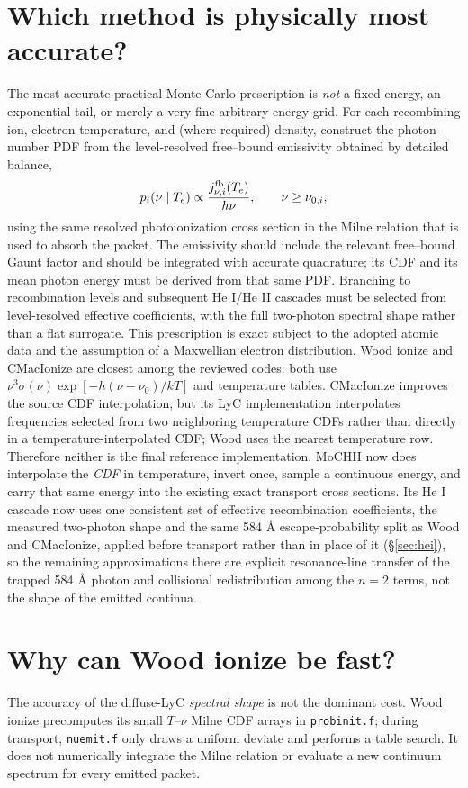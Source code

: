 \documentclass[11pt]{my_memo}
\begin{document}
\section{Which method is physically most accurate?}\label{sec:accurate}
The most accurate practical Monte-Carlo prescription is \emph{not} a fixed energy, an exponential tail, or merely a very fine arbitrary energy grid.  For each recombining ion, electron temperature, and (where required) density, construct the photon-number PDF from the level-resolved free--bound emissivity obtained by detailed balance,
\[p_i(\nu\mid T_e)\propto \frac{j^{\rm fb}_{\nu,i}(T_e)}{h\nu},\qquad \nu\ge\nu_{0,i},\]
using the same resolved photoionization cross section in the Milne relation that is used to absorb the packet.  The emissivity should include the relevant free--bound Gaunt factor and should be integrated with accurate quadrature; its CDF and its mean photon energy must be derived from that same PDF.  Branching to recombination levels and subsequent He I/He II cascades must be selected from level-resolved effective coefficients, with the full two-photon spectral shape rather than a flat surrogate.  This prescription is exact subject to the adopted atomic data and the assumption of a Maxwellian electron distribution.
Wood ionize and CMacIonize are closest among the reviewed codes: both use $\nu^3\sigma(\nu)\exp[-h(\nu-\nu_0)/kT]$ and temperature tables.  CMacIonize improves the source CDF interpolation, but its LyC implementation interpolates frequencies selected from two neighboring temperature CDFs rather than directly in a temperature-interpolated CDF; Wood uses the nearest temperature row.  Therefore neither is the final reference implementation.  MoCHII now does interpolate the \emph{CDF} in temperature, invert once, sample a continuous energy, and carry that same energy into the existing exact transport cross sections.  Its He I cascade now uses one consistent set of effective recombination coefficients, the measured two-photon shape and the same 584 \AA{} escape-probability split as Wood and CMacIonize, applied before transport rather than in place of it (\S\ref{sec:hei}), so the remaining approximations there are explicit resonance-line transfer of the trapped 584 \AA{} photon and collisional redistribution among the $n=2$ terms, not the shape of the emitted continua.
\section{Why can Wood ionize be fast?}
The accuracy of the diffuse-LyC \emph{spectral shape} is not the dominant cost.  Wood ionize precomputes its small $T$--$\nu$ Milne CDF arrays in \texttt{probinit.f}; during transport, \texttt{nuemit.f} only draws a uniform deviate and performs a table search.  It does not numerically integrate the Milne relation or evaluate a new continuum spectrum for every emitted packet.
\end{document}
